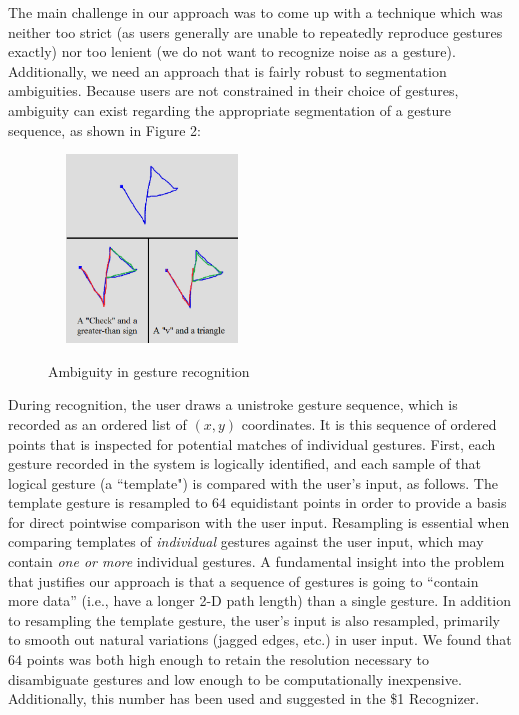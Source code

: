 \documentclass[twoside]{article}
\begin{document}
\begin{multicols}{2}
The main challenge in our
approach was to come up with a technique which was neither too strict (as users
generally are unable to repeatedly reproduce gestures exactly) nor too lenient
(we do not want to recognize noise as a gesture). Additionally, we need an approach
that is fairly robust to segmentation ambiguities. Because users are not constrained in their choice of gestures,
ambiguity can exist regarding the appropriate segmentation of a gesture sequence, as shown
in Figure 2: 

\begin{figure}[H]
	\centering
	\includegraphics[height=5cm, width=5.5cm]{Images/Ambiguity1.png}
	\label{fig2}
	\caption{Ambiguity in gesture recognition}
\end{figure}

During recognition, the user draws a unistroke gesture sequence, which is recorded as an ordered
list of $(x,y)$ coordinates. It is this sequence of ordered points that is
inspected for potential matches of individual gestures. First, each
gesture recorded in the system is logically identified, and each sample of that
logical gesture (a ``template") is compared with the user's input, as follows.
The template gesture is resampled to $64$ equidistant points in order to provide
a basis for direct pointwise comparison with the user input. Resampling is
essential when comparing templates of \emph{individual} gestures against the
user input, which may contain \emph{one or more} individual gestures. A
fundamental insight into the problem that justifies our approach is that a
sequence of gestures is going to ``contain more data'' (i.e., have a longer 2-D
path length) than a single gesture. In addition to resampling the template
gesture, the user's input is also resampled, primarily to smooth out natural
variations (jagged edges, etc.) in user input. We found that $64$ points was
both high enough to retain the resolution necessary to disambiguate gestures and
low enough to be computationally inexpensive. Additionally, this number has
been used and suggested in the \$1 Recognizer\cite{wobbrock2007gestures}.


\end{multicols}
\end{document}
